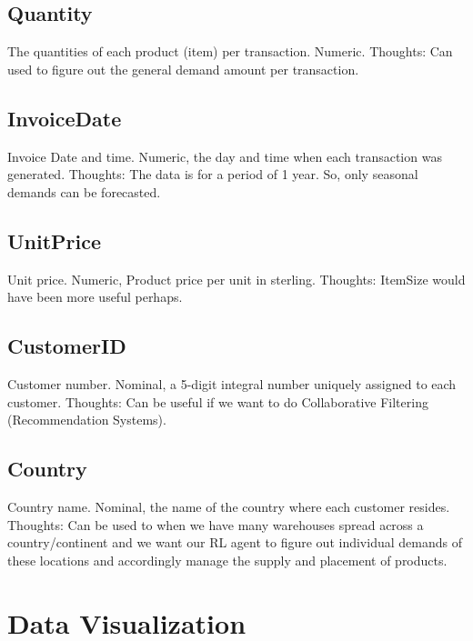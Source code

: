 \documentclass{article}
\begin{document}
\subsection{Quantity} 
The quantities of each product (item) per transaction. Numeric. \newline 
Thoughts: Can used to figure out the general demand amount per transaction. 

\subsection{InvoiceDate} 
Invoice Date and time. Numeric, the day and time when each transaction was generated. \newline 
Thoughts: The data is for a period of 1 year. So, only seasonal demands can be forecasted. 

\subsection{UnitPrice}
Unit price. Numeric, Product price per unit in sterling.
Thoughts: ItemSize would have been more useful perhaps. 

\subsection{CustomerID} 
Customer number. Nominal, a 5-digit integral number uniquely assigned to each customer. \newline 
Thoughts: Can be useful if we want to do Collaborative Filtering (Recommendation Systems). 

\subsection{Country} 
Country name. Nominal, the name of the country where each customer resides. 
Thoughts: Can be used to when we have many warehouses spread across a country/continent and we want our RL agent to figure out individual demands of these locations and accordingly manage the supply and placement of products. 


\section{Data Visualization} 
\end{document}

